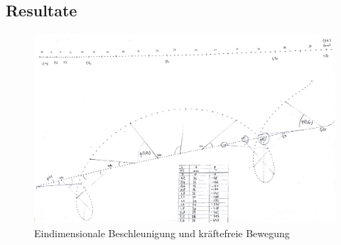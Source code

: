 \documentclass[12pt,a4paper]{article}
\begin{document}
\begin{multicols}{2}
%

\end{multicols}

\subsection{Resultate}




\begin{figure}[H]
	\centering
	\includegraphics[scale=0.25, angle=-90]{./figure/bewegungen.jpg}
	\caption{Eindimensionale Beschleunigung und kräftefreie Bewegung}
	\label{fig:bewegungen}
\end{figure}

\end{document}
